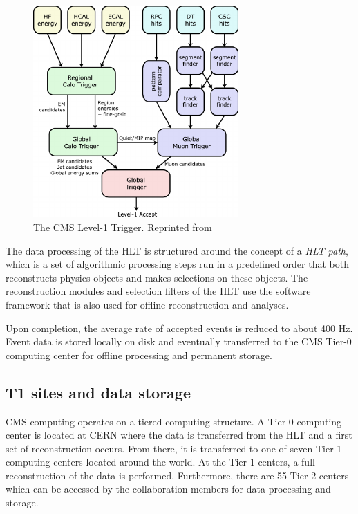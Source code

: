  \begin{figure}[h]
 	\centering
 	\includegraphics[width=0.7\textwidth]{figures/The-CMS-Level-1-Trigger.png}
 	\singlespace
 	\caption{The CMS Level-1 Trigger. Reprinted from \cite{cmsglobaltrigger}}
 	\label{fig:l1trig}
 \end{figure}

The data processing of the HLT is structured around the concept of a \textit{HLT path}, which is a set of algorithmic processing steps run in a predefined order that both reconstructs physics objects and makes selections on these objects. The reconstruction modules and selection filters of the HLT use the software framework that is also used for offline reconstruction and analyses.

Upon completion, the average rate of accepted events is reduced to about 400 Hz. Event data is stored locally on disk and eventually transferred to the CMS Tier-0 computing center for offline processing and permanent storage.


\subsection{T1 sites and data storage}

CMS computing operates on a tiered computing structure. A Tier-0 computing center is located at CERN where the data is transferred from the HLT and a first set of reconstruction occurs. From there, it is transferred to one of seven Tier-1 computing centers located around the world. At the Tier-1 centers, a full reconstruction of the data is performed. Furthermore, there are 55 Tier-2 centers which can be accessed by the collaboration members for data processing and storage.

